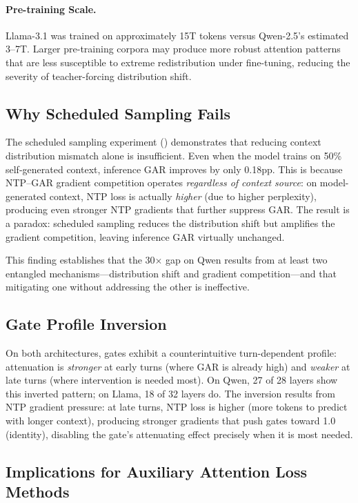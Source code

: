 \documentclass[11pt,a4paper]{article}
\begin{document}
\paragraph{Pre-training Scale.}
Llama-3.1 was trained on approximately 15T tokens versus Qwen-2.5's estimated 3--7T.
Larger pre-training corpora may produce more robust attention patterns that are less susceptible to extreme redistribution under fine-tuning, reducing the severity of teacher-forcing distribution shift.

\subsection{Why Scheduled Sampling Fails}

The scheduled sampling experiment () demonstrates that reducing context distribution mismatch alone is insufficient.
Even when the model trains on 50\% self-generated context, inference GAR improves by only 0.18pp.
This is because NTP--GAR gradient competition operates \emph{regardless of context source}: on model-generated context, NTP loss is actually \emph{higher} (due to higher perplexity), producing even stronger NTP gradients that further suppress GAR.
The result is a paradox: scheduled sampling reduces the distribution shift but amplifies the gradient competition, leaving inference GAR virtually unchanged.

This finding establishes that the 30$\times$ gap on Qwen results from at least two entangled mechanisms---distribution shift and gradient competition---and that mitigating one without addressing the other is ineffective.

\subsection{Gate Profile Inversion}

On both architectures, gates exhibit a counterintuitive turn-dependent profile: attenuation is \emph{stronger} at early turns (where GAR is already high) and \emph{weaker} at late turns (where intervention is needed most).
On Qwen, 27 of 28 layers show this inverted pattern; on Llama, 18 of 32 layers do.
The inversion results from NTP gradient pressure: at late turns, NTP loss is higher (more tokens to predict with longer context), producing stronger gradients that push gates toward 1.0 (identity), disabling the gate's attenuating effect precisely when it is most needed.

\subsection{Implications for Auxiliary Attention Loss Methods}
\end{document}
